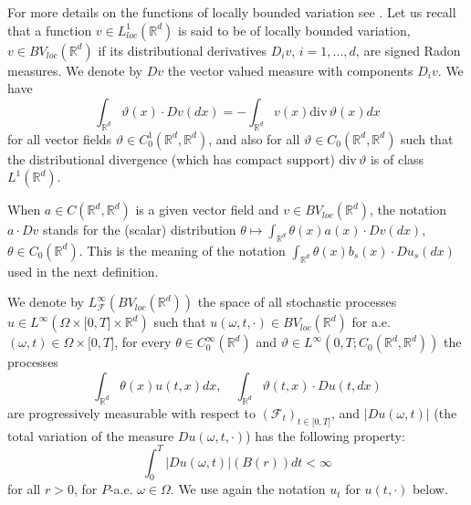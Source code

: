 \documentclass[a4paper,11pt]{article}
\begin{document}
For more details on the functions of locally bounded variation see \cite{GMS}%
. Let us recall that a function $v\in L_{loc}^{1}(\mathbb{R}^{d})$ is said
to be of locally bounded variation, $v\in BV_{loc}(\mathbb{R}^{d})$ if its
distributional derivatives $D_{i}v$, $i=1,...,d$, are signed Radon measures.
We denote by $Dv$ the vector valued measure with components $D_{i}v$. We
have
\begin{equation*}
\int_{\mathbb{R}^{d}}\vartheta (x)\cdot Dv(dx)=-\int_{\mathbb{R}^{d}}v(x)%
\mathrm{div}\,\vartheta (x)dx
\end{equation*}
for all vector fields $\vartheta \in C_{0}^{1}(\mathbb{R}^{d},\mathbb{R}%
^{d}) $, and also for all $\vartheta \in C_{0}(\mathbb{R}^{d},\mathbb{R}%
^{d}) $ such that the distributional divergence (which has compact support) $%
\mathrm{div}\,\vartheta $ is of class $L^{1}(\mathbb{R}^{d})$.

When $a\in C(\mathbb{R}^{d},\mathbb{R}^{d})$ is a given vector field and $%
v\in BV_{loc}(\mathbb{R}^{d})$, the notation $a\cdot Dv$ stands for the
(scalar) distribution $\theta\mapsto\int_{\mathbb{R}^{d}}\theta(x)a(x)\cdot
Dv(dx)$, $\theta\in C_{0}(\mathbb{R}^{d})$. This is the meaning of the
notation $\int_{\mathbb{R}^{d}}\theta(x)b_{s}(x)\cdot Du_{s}(dx)$ used in
the next definition.

We denote by $L_{\mathcal{F}}^{\infty}(BV_{loc}(\mathbb{R}^{d}))$ the space
of all stochastic processes $u\in L^{\infty}(\Omega\times\lbrack0,T]\times
\mathbb{R}^{d})$ such that $u(\omega,t,\cdot)\in BV_{loc}(\mathbb{R}^{d})$
for a.e. $(\omega,t)\in\Omega\times\lbrack0,T]$, for every $\theta\in
C_{0}^{\infty}(\mathbb{R}^{d})$ and $\vartheta\in L^{\infty}(0,T;C_{0}(%
\mathbb{R}^{d},\mathbb{R}^{d}))$ the processes
\begin{equation*}
\int_{\mathbb{R}^{d}}\theta(x)u(t,x)dx,\quad\int_{\mathbb{R}%
^{d}}\vartheta(t,x)\cdot Du(t,dx)
\end{equation*}
are progressively measurable with respect to $(\mathcal{F}_{t})_{t\in
\lbrack0,T]}$, and $|Du(\omega,t)|$ (the total variation of the measure $%
Du(\omega,t,\cdot)$) has the following property:
\begin{equation}
\int_{0}^{T}|Du(\omega,t)|\left( B\left( r\right) \right) dt<\infty
\label{L1 BV}
\end{equation}
for all $r>0$, for $P$-a.e. $\omega\in\Omega$. We use again the notation $%
u_{t}$ for $u ( t,\cdot) $ below.
\end{document}
